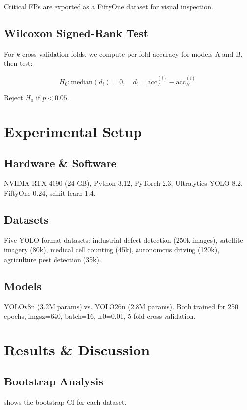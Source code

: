 \documentclass[10pt,twocolumn,letterpaper]{article}
\begin{document}
Critical FPs are exported as a FiftyOne dataset for visual inspection.

\subsection{Wilcoxon Signed-Rank Test}
For $k$ cross-validation folds, we compute per-fold accuracy for models A and B, then test:

\begin{equation}
    H_0: \text{median}(d_i) = 0, \quad d_i = \text{acc}_A^{(i)} - \text{acc}_B^{(i)}
\end{equation}

Reject $H_0$ if $p < 0.05$.

\section{Experimental Setup}
\subsection{Hardware \& Software}
NVIDIA RTX 4090 (24 GB), Python 3.12, PyTorch 2.3, Ultralytics YOLO 8.2, FiftyOne 0.24, scikit-learn 1.4.

\subsection{Datasets}
Five YOLO-format datasets: industrial defect detection (250k images), satellite imagery (80k), medical cell counting (45k), autonomous driving (120k), agriculture pest detection (35k).

\subsection{Models}
YOLOv8n (3.2M params) vs. YOLO26n (2.8M params). Both trained for 250 epochs, imgsz=640, batch=16, lr0=0.01, 5-fold cross-validation.

\section{Results \& Discussion}

\subsection{Bootstrap Analysis}
 shows the bootstrap CI for each dataset.
\end{document}
